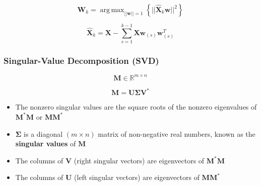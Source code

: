 \documentclass[a4paper]{article}
\DeclareMathOperator*{\argmax}{arg\,max}
\begin{document}
$$ \mathbf{W}_k = \argmax_{||\mathbf{w}||=1}\left\{ ||\mathbf{\hat{X}}_k\mathbf{w}||^2 \right\} $$

$$ \mathbf{\hat{X}}_k = \mathbf{X}-\sum_{s=1}^{k-1}\mathbf{Xw}_{(s)}\mathbf{w}_{(s)}^T $$

\subsubsection{Singular-Value Decomposition (SVD)}

$$ \mathbf{M} \in \mathbb{R}^{m \times n}$$

$$ \mathbf{M} = \mathbf{U\Sigma V}^* $$

\begin{itemize}
  \item The nonzero singular values are the square roots of the nonzero eigenvalues of $\mathbf{M}^*\mathbf{M}$ or $\mathbf{MM}^*$
  \item $\mathbf{\Sigma}$ is a diagonal $(m \times n)$ matrix of non-negative real numbers, known as the \textbf{singular values} of $\mathbf{M}$
  \item The columns of $\mathbf{V}$ (right singular vectors) are eigenvectors of $\mathbf{M}^*\mathbf{M}$
  \item The columns of $\mathbf{U}$ (left singular vectors) are eigenvectors of $\mathbf{MM}^*$
\end{itemize}
\end{document}
